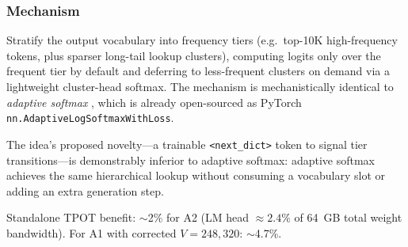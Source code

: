 \documentclass[11pt]{article}
\begin{document}
\subsubsection*{Mechanism}
Stratify the output vocabulary into frequency tiers (e.g.\ top-10K high-frequency tokens, plus sparser long-tail lookup clusters), computing logits only over the frequent tier by default and deferring to less-frequent clusters on demand via a lightweight cluster-head softmax.
The mechanism is mechanistically identical to \emph{adaptive softmax} \cite{GraveEtAl2017}, which is already open-sourced as PyTorch \texttt{nn.AdaptiveLogSoftmaxWithLoss}.

The idea's proposed novelty---a trainable \texttt{<next\_dict>} token to signal tier transitions---is demonstrably inferior to adaptive softmax: adaptive softmax achieves the same hierarchical lookup without consuming a vocabulary slot or adding an extra generation step.

Standalone TPOT benefit: $\sim$2\% for A2 (LM head $\approx 2.4\%$ of 64~GB total weight bandwidth).
For A1 with corrected $V=248{,}320$: $\sim$4.7\%.
\end{document}
